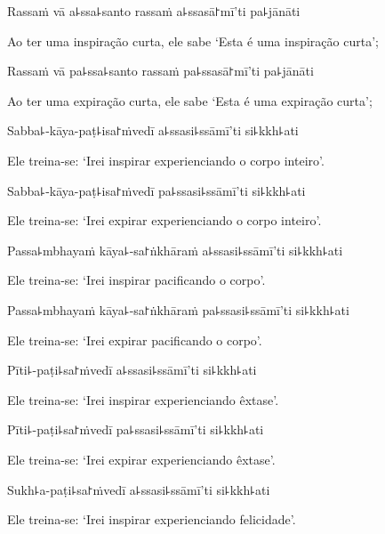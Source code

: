Rassaṁ vā a꜕ssa꜕santo rassaṁ a꜕ssasā꜓mī'ti pa꜕jānāti

\begin{english}
  Ao ter uma inspiração curta, ele sabe `Esta é uma inspiração curta';
\end{english}

Rassaṁ vā pa꜕ssa꜕santo rassaṁ pa꜕ssasā꜓mī'ti pa꜕jānāti

\begin{english}
  Ao ter uma expiração curta, ele sabe `Esta é uma expiração curta';
\end{english}

Sabba꜕-kāya-paṭ꜕isa꜓ṁvedī a꜕ssasi꜕ssāmī'ti si꜕kkh꜕ati

\begin{english}
  Ele treina-se: `Irei inspirar experienciando o corpo inteiro'.
\end{english}

Sabba꜕-kāya-paṭ꜕isa꜓ṁvedī pa꜕ssasi꜕ssāmī'ti si꜕kkh꜕ati

\begin{english}
  Ele treina-se: `Irei expirar experienciando o corpo inteiro'.
\end{english}

Passa꜕mbhayaṁ kāya꜕-sa꜓ṅkhāraṁ a꜕ssasi꜕ssāmī'ti si꜕kkh꜕ati

\begin{english}
  Ele treina-se: `Irei inspirar pacificando o corpo'.
\end{english}

Passa꜕mbhayaṁ kāya꜕-sa꜓ṅkhāraṁ pa꜕ssasi꜕ssāmī'ti si꜕kkh꜕ati

\begin{english}
  Ele treina-se: `Irei expirar pacificando o corpo'.
\end{english}

Pīti꜕-paṭi꜕sa꜓ṁvedī a꜕ssasi꜕ssāmī'ti si꜕kkh꜕ati

\begin{english}
  Ele treina-se: `Irei inspirar experienciando êxtase'.
\end{english}

Pīti꜕-paṭi꜕sa꜓ṁvedī pa꜕ssasi꜕ssāmī'ti si꜕kkh꜕ati

\begin{english}
  Ele treina-se: `Irei expirar experienciando êxtase'.
\end{english}

Sukh꜕a-paṭi꜕sa꜓ṁvedī a꜕ssasi꜕ssāmī'ti si꜕kkh꜕ati

\begin{english}
  Ele treina-se: `Irei inspirar experienciando felicidade'.
\end{english}

